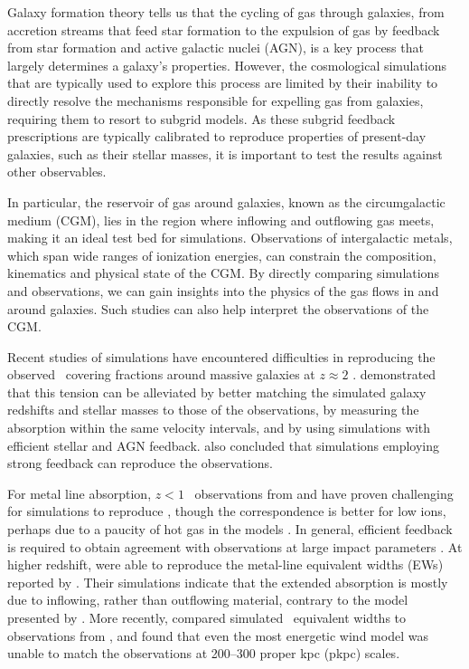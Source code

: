 \documentclass[useAMS,usenatbib,letterpaper]{mn2e}
\begin{document}
Galaxy formation theory tells us that the cycling of gas 
through galaxies, from accretion streams that feed star formation
to the expulsion of gas by feedback from star formation and active galactic nuclei (AGN),
is a key process that largely determines a galaxy's properties. 
However, the
cosmological simulations that are typically used to explore this process are 
limited by their inability to directly resolve
the mechanisms responsible for expelling gas from galaxies,
requiring them to resort to subgrid models. As
these subgrid feedback prescriptions are typically calibrated
to reproduce properties of present-day galaxies, such as 
their stellar masses, it is important
to test the results against other observables.


In particular, the reservoir of gas around galaxies, known as
the circumgalactic medium (CGM), lies in the region where 
inflowing and outflowing gas meets, making it an ideal test bed for simulations. 
Observations of intergalactic metals,
which span wide ranges of ionization energies, can constrain
the composition, kinematics and physical state of the CGM.
By directly comparing simulations and observations, 
we can gain insights into the physics of the gas flows in and around galaxies.
Such studies can also help interpret the observations 
of the CGM.


Recent studies of simulations have encountered difficulties in
reproducing the observed \hone\ covering fractions
around massive galaxies at $z\approx2$ \citep{fumagalli14, fauchergiguere15, meiksin15}.
\citet{rahmati15} demonstrated that this tension
can be alleviated by better matching the simulated galaxy redshifts and stellar masses
to those of the observations, by measuring the absorption within the same velocity intervals,
and by using simulations with efficient stellar and AGN feedback. 
\citet{fauchergiguere16, meiksin17} also concluded that simulations employing strong feedback
can reproduce the observations. 


For metal line absorption,  $z<1$ \osix\ observations from \citet{tumlinson11}
and \citet{prochaska11} have proven challenging for simulations to reproduce
\citep{suresh16, oppenheimer16}, though the correspondence 
is better for low ions, perhaps due to a paucity of hot gas in the models
\citep{hummels13, ford16}. In general, efficient
feedback is required to obtain agreement with
observations at large impact parameters
\citep{stinson12, hummels13}.
At higher redshift, \citet{shen13} were able to reproduce the metal-line
equivalent widths (EWs) reported by \citet{steidel10}. Their simulations indicate that the extended
absorption is mostly due to inflowing, rather than outflowing material,
contrary to the model presented by \citet{steidel10}. 
More recently, \citet{suresh15} compared simulated \cfour\ equivalent widths
to observations from \citet{turner14}, and found that even the most energetic wind
model was unable to match the observations at 200--300 proper kpc (pkpc) scales. 
\end{document}
